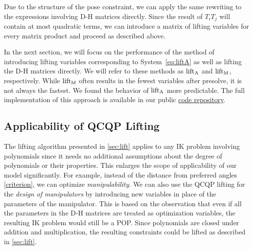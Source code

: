 Due to the structure of the pose constraint, we can apply the same rewriting to the expressions involving D-H matrices directly. Since the result of $T_iT_j$ will contain at most quadratic terms, we can introduce a matrix of lifting variables for every matrix product and proceed as described above.

In the next section, we will focus on the performance of the method of introducing lifting variables corresponding to System~\ref{eq:liftA} as well as lifting the D-H matrices directly. We will refer to these methods as $\operatorname{lift}_\text{A}$ and $\operatorname{lift}_\text{M}$, respectively. While $\operatorname{lift}_\text{M}$ often results in the fewest variables after presolve, it is not always the fastest. We found the behavior of $\operatorname{lift}_\text{A}$ more predictable. The full implementation of this approach is available in our public \href{https://github.com/votroto/IK.jl}{code repository}.

\subsection{Applicability of QCQP Lifting}
The lifting algorithm presented in \cref{sec:lift} applies to any IK problem involving polynomials since it needs no additional assumptions about the degree of polynomials or their properties. This enlarges the scope of applicability of our model significantly. For example, instead of the distance from preferred angles \eqref{criterion}, we can optimize \emph{manipulability}. We can also use the QCQP lifting for the \emph{design of manipulators} by introducing new variables in place of the parameters of the manipulator. This is based on the observation that even if all the parameters in the D-H matrices are treated as optimization variables, the resulting IK problem would still be a POP. Since polynomials are closed under addition and multiplication, the resulting constraints could be lifted as described in \cref{sec:lift}.
